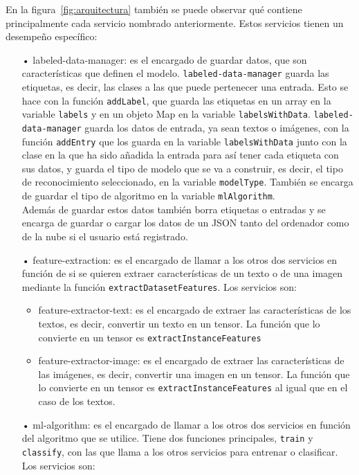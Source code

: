 \documentclass[a4paper, 12pt]{book}
\begin{document}
En la figura~\ref{fig:arquitectura} también se puede observar qué contiene principalmente cada servicio nombrado anteriormente. Estos servicios tienen un desempeño específico:

\begin{itemize}
	\item[•] labeled-data-manager: es el encargado de guardar datos, que son características que definen el modelo. \texttt{labeled-data-manager} guarda las etiquetas, es decir, las clases a las que puede pertenecer una entrada. Esto se hace con la función \texttt{addLabel}, que guarda las etiquetas en un array en la variable \texttt{labels} y en un objeto Map en la variable \texttt{labelsWithData}. 
	\texttt{labeled-data-manager} guarda los datos de entrada, ya sean textos o imágenes, con la función \texttt{addEntry} que los guarda en la variable \texttt{labelsWithData} junto con la clase en la que ha sido añadida la entrada para así tener cada etiqueta con sus datos, y guarda el tipo de modelo que se va a construir, es decir, el tipo de reconocimiento seleccionado, en la variable \texttt{modelType}. También se encarga de guardar el tipo de algoritmo en la variable \texttt{mlAlgorithm}. \\
	Además de guardar estos datos también borra etiquetas o entradas y se encarga de guardar o cargar los datos de un JSON tanto del ordenador como de la nube si el usuario está registrado.
	
	\item[•] feature-extraction: es el encargado de llamar a los otros dos servicios en función de si se quieren extraer características de un texto o de una imagen mediante la función \texttt{extractDatasetFeatures}. Los servicios son:
	
	\begin{itemize}
		\item feature-extractor-text: es el encargado de extraer las características de los textos, es decir, convertir un texto en un tensor. 
		La función que lo convierte en un tensor es \texttt{extractInstanceFeatures}
		
		\item feature-extractor-image: es el encargado de extraer las características de las imágenes, es decir, convertir una imagen en un tensor. 
		La función que lo convierte en un tensor es \texttt{extractInstanceFeatures} al igual que en el caso de los textos.
	\end{itemize}
	
	\item[•] ml-algorithm: es el encargado de llamar a los otros dos servicios en función del algoritmo que se utilice. 
	Tiene dos funciones principales, \texttt{train} y \texttt{classify}, con las que llama a los otros servicios para entrenar o clasificar. Los servicios son:
	

\end{itemize}
\end{document}
